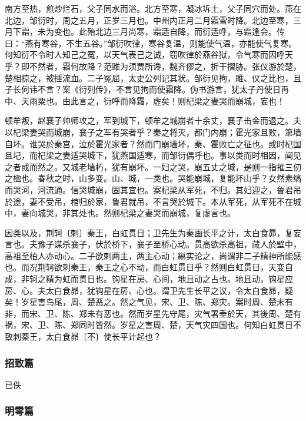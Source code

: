 \documentclass[]{article}
\begin{document}
南方至热，煎炒烂石，父子同水而浴。北方至寒，凝冰坼土，父子同穴而处。燕在北边，邹衍时，周之五月，正岁三月也。中州内正月二月霜雪时降。北边至寒，三月下霜，未为变也。此殆北边三月尚寒，霜适自降，而衍适呼，与霜逢会。传曰：``燕有寒谷，不生五谷。''邹衍吹律，寒谷复温，则能使气温，亦能使气复寒。何知衍不令时人知己之冤，以天气表己之诚，窃吹律於燕谷狱，令气寒而因呼天乎？即不然者，霜何故降？范雎为须贾所谗，魏齐僇之，折干摺胁。张仪游於楚，楚相掠之，被捶流血。二子冤屈，太史公列记其状。邹衍见拘，雎、仪之比也，且子长何讳不言？案《衍列传》，不言见拘而使霜降。伪书游言，犹太子丹使日再中、天雨粟也。由此言之，衍呼而降霜，虚矣！则杞梁之妻哭而崩城，妄也！

顿牟叛，赵襄子帅师攻之，军到城下，顿牟之城崩者十余丈，襄子击金而退之。夫以杞梁妻哭而城崩，襄子之军有哭者乎？秦之将灭，都门内崩；霍光家且败，第墙自坏。谁哭於秦宫，泣於霍光家者？然而门崩墙坏，秦、霍败亡之征也。或时杞国且圮，而杞梁之妻适哭城下，犹燕国适寒，而邹衍偶呼也。事以类而时相因，闻见之者或而然之。又城老墙朽，犹有崩坏。一妇之哭，崩五丈之城，是则一指摧三仞之楹也。春秋之时，山多变。山、城，一类也。哭能崩城，复能坏山乎？女然素缟而哭河，河流通。信哭城崩，固其宜也。案杞梁从军死，不归。其妇迎之，鲁君吊於途，妻不受吊，棺归於家，鲁君就吊，不言哭於城下。本从军死，从军死不在城中，妻向城哭，非其处也。然则杞梁之妻哭而崩城，复虚言也。

因类以及，荆轲〔刺〕秦王，白虹贯日；卫先生为秦画长平之计，太白食昴，复妄言也。夫豫子谋杀襄子，伏於桥下，襄子至桥心动。贯高欲杀高祖，藏人於壁中，高祖至柏人亦动心。二子欲刺两主，两主心动；綝实论之，尚谓非二子精神所能感也。而况荆轲欲刺秦王，秦王之心不动，而白虹贯日乎？然则白虹贯日，天变自成，非轲之精为虹而贯日也。钩星在房、心间，地且动之占也。地且动，钩星应房、心。夫太白食昴，犹钩星在房、心也。谓卫先生长平之议，令太白食昴，疑矣！岁星害鸟尾，周、楚恶之。然之气见，宋、卫、陈、郑灾。案时周、楚未有非，而宋、卫、陈、郑未有恶也。然而岁星先守尾，灾气署垂於天，其後周、楚有祸，宋、卫、陈、郑同时皆然。岁星之害周、楚，天气灾四国也。何知白虹贯日不致刺秦王，太白食昴〔不〕使长平计起也？

\hypertarget{header-n633}{%
\subsubsection{招致篇}\label{header-n633}}

已佚

\hypertarget{header-n637}{%
\subsubsection{明雩篇}\label{header-n637}}
\end{document}
